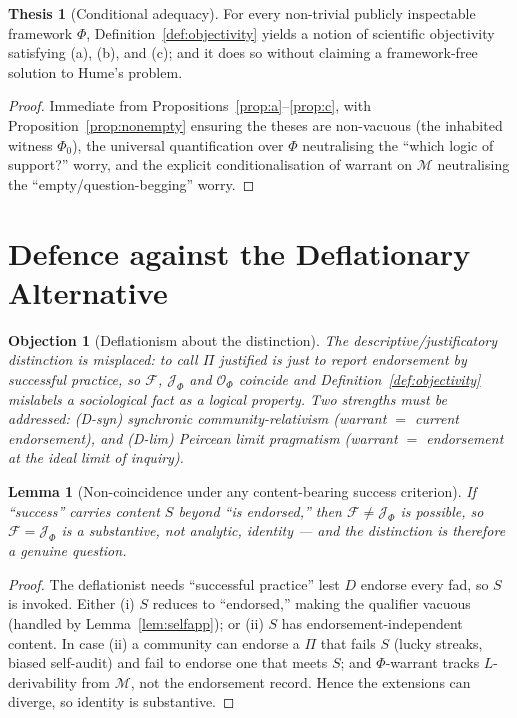 \documentclass{amsart}
\theoremstyle{definition}
\newtheorem{thesis}{Thesis}
\theoremstyle{plain}
\newtheorem{lemma}{Lemma}
\newtheorem{objection}{Objection}
\theoremstyle{remark}
\begin{document}
\begin{thesis}[Conditional adequacy]\label{thesis:adequacy}
For every non-trivial publicly inspectable framework $\Phi$,
Definition~\ref{def:objectivity} yields a notion of scientific objectivity
satisfying (a), (b), and (c); and it does so without claiming a framework-free
solution to Hume's problem.
\end{thesis}

\begin{proof}
Immediate from Propositions~\ref{prop:a}--\ref{prop:c}, with
Proposition~\ref{prop:nonempty} ensuring the theses are non-vacuous (the
inhabited witness $\Phi_0$), the universal quantification over $\Phi$
neutralising the ``which logic of support?'' worry, and the explicit
conditionalisation of warrant on $\mathcal{M}$ neutralising the
``empty/question-begging'' worry.
\end{proof}

\section{Defence against the Deflationary Alternative}

\begin{objection}[Deflationism about the distinction]\label{obj:deflation}
The descriptive/justificatory distinction is misplaced: to call $\Pi$ justified
is just to report endorsement by successful practice, so $\mathcal{F}$,
$\mathcal{J}_\Phi$ and $\mathcal{O}_\Phi$ coincide and
Definition~\ref{def:objectivity} mislabels a sociological fact as a logical
property. Two strengths must be addressed: \emph{(D-syn)} synchronic
community-relativism (warrant $=$ current endorsement), and \emph{(D-lim)}
Peircean limit pragmatism (warrant $=$ endorsement at the ideal limit of
inquiry).
\end{objection}

\begin{lemma}[Non-coincidence under any content-bearing success criterion]
\label{lem:noncoincide}
If ``success'' carries content $S$ beyond ``is endorsed,'' then
$\mathcal{F}\neq\mathcal{J}_\Phi$ is possible, so $\mathcal{F}=\mathcal{J}_\Phi$
is a substantive, not analytic, identity --- and the distinction is therefore a
genuine question.
\end{lemma}

\begin{proof}
The deflationist needs ``successful practice'' lest $D$ endorse every fad, so
$S$ is invoked. Either (i) $S$ reduces to ``endorsed,'' making the qualifier
vacuous (handled by Lemma~\ref{lem:selfapp}); or (ii) $S$ has
endorsement-independent content. In case (ii) a community can endorse a
$\Pi$ that fails $S$ (lucky streaks, biased self-audit) and fail to endorse one
that meets $S$; and $\Phi$-warrant tracks $L$-derivability from $\mathcal{M}$,
not the endorsement record. Hence the extensions can diverge, so identity is
substantive.
\end{proof}
\end{document}

